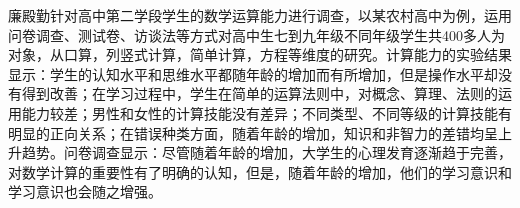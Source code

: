 廉殿勤针对高中第二学段学生的数学运算能力进行调查，以某农村高中为例，运用问卷调查、测试卷、访谈法等方式对高中生七到九年级不同年级学生共400多人为对象，从口算，列竖式计算，简单计算，方程等维度的研究。计算能力的实验结果显示：学生的认知水平和思维水平都随年龄的增加而有所增加，但是操作水平却没有得到改善；在学习过程中，学生在简单的运算法则中，对概念、算理、法则的运用能力较差；男性和女性的计算技能没有差异；不同类型、不同等级的计算技能有明显的正向关系；在错误种类方面，随着年龄的增加，知识和非智力的差错均呈上升趋势。问卷调查显示：尽管随着年龄的增加，大学生的心理发育逐渐趋于完善，对数学计算的重要性有了明确的认知，但是，随着年龄的增加，他们的学习意识和学习意识也会随之增强。